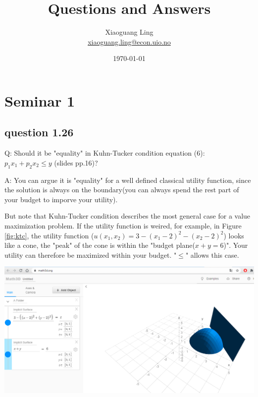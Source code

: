 \documentclass{article}
\title{Questions and Answers}
\author{Xiaoguang Ling \\  \href{xiaoguang.ling@econ.uio.no}{xiaoguang.ling@econ.uio.no}}
\date{\today}
\begin{document}
\maketitle

\tableofcontents

\newpage
\section{Seminar 1}

\subsection{question 1.26}

Q: Should it be "equality" in Kuhn-Tucker condition equation (6): $p_1x_1 + p_2x_2 \le y$ (slides pp.16)?

\vspace{2mm}

A: You can argue it is "equality" for a well defined
classical utility function, since the solution is always
on the boundary(you can always spend the rest part of your
budget to imporve your utility).

But note that Kuhn-Tucker condition describes the most
general case for a value maximization problem. If the 
utility function is weired, for example, in Figure \ref{fig:ktc},
the utility function ($u(x_1,x_2) =3-\left(x_1-2\right)^2-\left(x_2-2\right)^2$) looks like a cone, the "peak" of the cone
is within the "budget plane($x+y=6$)". Your utility can therefore be maximized within your budget. "$\le$" allows this case.

\vspace{2mm}

{\centering
\includegraphics[width=1\textwidth]{1.q_ktc}
\label{fig:ktc}}
\end{document}
